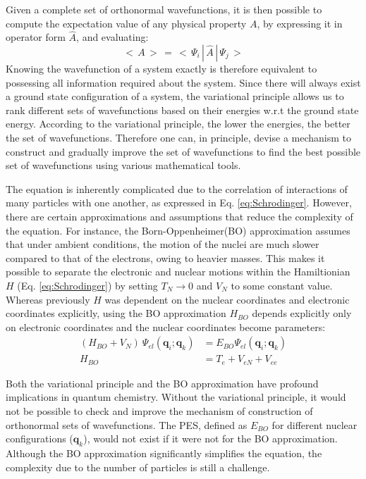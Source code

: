             Given a complete set of orthonormal wavefunctions, it is then possible to compute the expectation value of any physical property $A$, by expressing it in operator form $\hat{A}$, and evaluating:
            \begin{equation}\label{eq:expectation value}
                <\,A\,>\, =\, < \,\Psi_i\,|\,\hat{A}\,|\, \Psi_j\,>
            \end{equation}
            Knowing the wavefunction of a system exactly is therefore equivalent to possessing all information required about the system. Since there will always exist a ground state configuration of a system, the variational principle allows us to rank different sets of wavefunctions based on their energies w.r.t the ground state energy. According to the variational principle, the lower the energies, the better the set of wavefunctions. Therefore one can, in principle, devise a mechanism to construct and gradually improve the set of wavefunctions to find the best possible set of wavefunctions using various mathematical tools.

            The \Schrodinger{} equation is inherently complicated due to the correlation of interactions of many particles with one another, as expressed in Eq. \eqref{eq:Schrodinger}. However, there are certain approximations and assumptions that reduce the complexity of the equation. For instance, the Born-Oppenheimer(BO) approximation assumes that under ambient conditions, the motion of the nuclei are much slower compared to that of the electrons, owing to heavier masses. This makes it possible to separate the electronic and nuclear motions within the Hamiltionian $H$ (Eq. \eqref{eq:Schrodinger}) by setting $T_N \to 0$ and $V_N$ to some constant value. Whereas previously $H$ was dependent on the nuclear coordinates and electronic coordinates explicitly, using the BO approximation $H_{BO}$ depends explicitly only on electronic coordinates and the nuclear coordinates become parameters:
            \begin{equation}\label{eq:BO approximation}
                \begin{aligned}
                    (H_{BO} + V_N)~\Psi_{el} (\mathbf{q}_i;\mathbf{q}_k) &= E_{BO} \Psi_{el} (\mathbf{q}_i;\mathbf{q}_k)\\
                    H_{BO} &= T_e + V_{eN} + V_{ee}
                \end{aligned}
            \end{equation}

            Both the variational principle and the BO approximation have profound implications in quantum chemistry. Without the variational principle, it would not be possible to check and improve the mechanism of construction of orthonormal sets of wavefunctions. The PES, defined as $E_{BO}$ for different nuclear configurations ($\mathbf{q}_k$), would not exist if it were not for the BO approximation. Although the BO approximation significantly simplifies the \Schrodinger{} equation, the complexity due to the number of particles is still a challenge.

